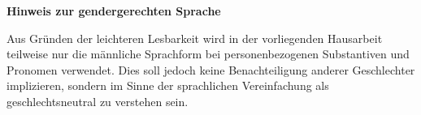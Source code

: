 \thispagestyle{empty}

\setlength{\parindent}{0pt}


\vspace*{\fill}

\large
\textcolor{blue!30!black}{\textbf{Hinweis zur gendergerechten Sprache}}
\newline

\normalsize
Aus Gründen der leichteren Lesbarkeit wird in der vorliegenden Hausarbeit teilweise nur die männliche Sprachform bei personenbezogenen Substantiven und Pronomen verwendet. Dies soll jedoch keine Benachteiligung anderer Geschlechter implizieren, sondern im Sinne der sprachlichen Vereinfachung als geschlechtsneutral zu verstehen sein. 

\vspace*{\fill}
